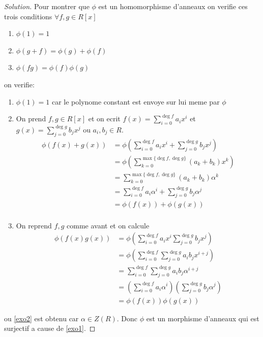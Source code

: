 \documentclass[a4paper,11pt,french]{report}
\theoremstyle{plain}
\theoremstyle{definition}
\begin{document}
\begin{proof}[Solution]
Pour montrer que $\phi$ est un homomorphisme d'anneaux on verifie ces trois conditions $\forall f,g\in R[x]$
\begin{enumerate}
\item $\phi(1)=1$
\item $\phi(g+f)=\phi(g)+\phi(f)$
\item $\phi(fg)=\phi(f)\phi(g)$
\end{enumerate}
on verifie:
\begin{enumerate}
\item $\phi(1)=1$ car le polynome constant est envoye sur lui meme par $\phi$
\item \label{exo1} On prend $f,g\in R[x]$ et on ecrit $f(x)=\sum_{i=0}^{\deg f}a_{i}x^{i}$ et $g(x)=\sum_{j=0}^{\deg g}b_{j}x^{j}$ ou $a_{i},b_{j}\in R$. 
\begin{align}
\phi(f(x)+g(x)) & =\phi\left( \sum_{i=0}^{\deg f} a_{i}x^{i}+\sum_{j=0}^{\deg g} b_{j}x^{j}  \right) \\
 & =\phi\left( \sum_{k=0}^{\max\{ \deg f,\deg g \}} (a_{k}+b_{k})x^{k} \right) \\
 & =\sum_{k=0}^{\max\{ \deg f,\deg g \}}(a_{k}+b_{k})\alpha^{k} \\
 & =\sum_{i=0}^{\deg f} a_{i}\alpha^{i}+\sum_{j=0}^{\deg g} b_{j}\alpha^{j}  \\
 & =\phi(f(x))+\phi(g(x)) \\
\end{align}
\item On reprend $f,g$ comme avant et on calcule 
\begin{align}
\phi(f(x)g(x)) & =\phi\left( \sum_{i=0}^{\deg f} a_{i}x^{i} \sum_{j=0}^{\deg g} b_{j}x^{j} \right) \\
 & =\phi\left( \sum_{i=0}^{\deg f} \sum_{j=0}^{\deg g} a_{i}b_{j}x^{i+j} \right) \\
 & =\sum_{i=0}^{\deg f} \sum_{j=0}^{\deg g} a_{i}b_{j}\alpha^{i+j} \label{exo2}\\
 & =\left( \sum_{i=0}^{\deg f } a_{i}\alpha^{i} \right)\left( \sum_{j=0}^{\deg g } b_{j}\alpha^{j} \right) \\
 & =\phi(f(x))\phi(g(x))
\end{align}
\end{enumerate}
ou \ref{exo2} est obtenu car $\alpha \in Z(R)$. Donc $\phi$ est un morphisme d'anneaux qui est surjectif a cause de \ref{exo1}.


\end{proof}
\end{document}
